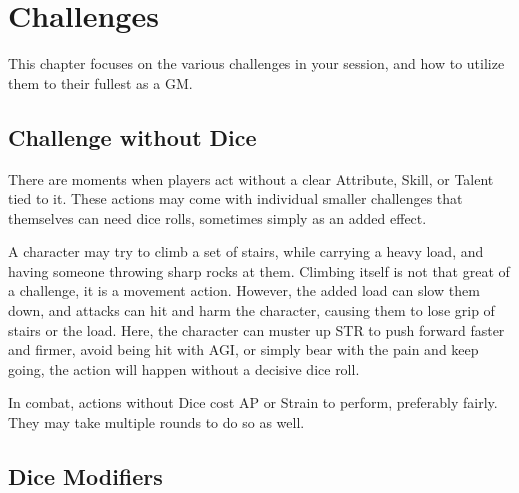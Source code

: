 \documentclass[11pt,a4paper,twocolumn]{book}
\begin{document}
    
    
     
    
    		
    
    \chapter{Challenges}
    
    This chapter focuses on the various challenges in your session, and how to utilize them to their fullest as a GM. 
    
    \section*{Challenge without Dice}
    
    There are moments when players act without a clear Attribute, Skill, or Talent tied to it. These actions may come with individual smaller challenges that themselves can need dice rolls, sometimes simply as an added effect.
    
    A character may try to climb a set of stairs, while carrying a heavy load, and having someone throwing sharp rocks at them. Climbing itself is not that great of a challenge, it is a movement action. However, the added load can slow them down, and attacks can hit and harm the character, causing them to lose grip of stairs or the load. Here, the character can muster up STR to push forward faster and firmer, avoid being hit with AGI, or simply bear with the pain and keep going, the action will happen without a decisive dice roll.
    
    In combat, actions without Dice cost AP or Strain to perform, preferably  fairly. They may take multiple rounds to do so as well. 
    
    \section*{Dice Modifiers}
    	
\end{document}
